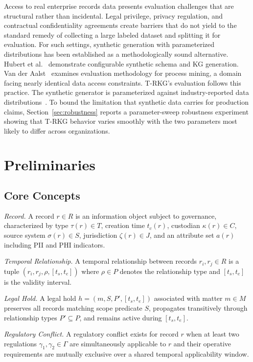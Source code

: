 \documentclass{ieeeaccess}
\begin{document}
Access to real enterprise records data presents evaluation challenges that are structural rather than incidental. Legal privilege, privacy regulation, and contractual confidentiality agreements create barriers that do not yield to the standard remedy of collecting a large labeled dataset and splitting it for evaluation. For such settings, synthetic generation with parameterized distributions has been established as a methodologically sound alternative. Hubert et al.~\cite{pygraft} demonstrate configurable synthetic schema and KG generation. Van der Aalst~\cite{vanderaalst2016} examines evaluation methodology for process mining, a domain facing nearly identical data access constraints. T-RKG's evaluation follows this practice. The synthetic generator is parameterized against industry-reported data distributions~\cite{databerg,igrm}. To bound the limitation that synthetic data carries for production claims, Section~\ref{sec:robustness} reports a parameter-sweep robustness experiment showing that T-RKG behavior varies smoothly with the two parameters most likely to differ across organizations.

\section{Preliminaries}

\subsection{Core Concepts}

\textit{Record.} A record $r \in R$ is an information object subject to governance, characterized by type $\tau(r) \in T$, creation time $t_c(r)$, custodian $\kappa(r) \in C$, source system $\sigma(r) \in S$, jurisdiction $\zeta(r) \in J$, and an attribute set $a(r)$ including PII and PHI indicators.

\textit{Temporal Relationship.} A temporal relationship between records $r_i, r_j \in R$ is a tuple $(r_i, r_j, \rho, [t_s, t_e])$ where $\rho \in P$ denotes the relationship type and $[t_s, t_e]$ is the validity interval.

\textit{Legal Hold.} A legal hold $h = (m, S, P', [t_s, t_e])$ associated with matter $m \in M$ preserves all records matching scope predicate $S$, propagates transitively through relationship types $P' \subseteq P$, and remains active during $[t_s, t_e]$.

\textit{Regulatory Conflict.} A regulatory conflict exists for record $r$ when at least two regulations $\gamma_1, \gamma_2 \in \Gamma$ are simultaneously applicable to $r$ and their operative requirements are mutually exclusive over a shared temporal applicability window.
\end{document}
